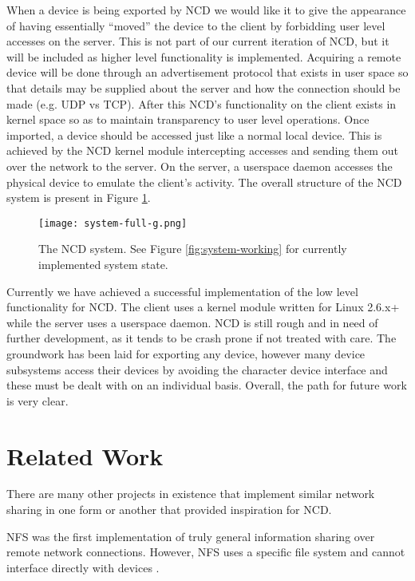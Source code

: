 \documentclass[11pt,twocolumn]{article}
\begin{document}
When a device is being exported by NCD we would like it to give the
appearance of having essentially ``moved'' the device to the client 
by forbidding user level accesses on the server. This is not part 
of our current iteration of NCD, but it will be included as higher
level functionality is implemented. Acquiring a remote device will be
done through an advertisement protocol that exists in user space so
that details may be supplied about the server and how the connection
should be made (e.g. UDP vs TCP).  After this NCD's functionality on
the client exists in kernel space so as to maintain transparency to
user level operations. Once imported, a device should be accessed just
like a normal local device.  This is achieved by the NCD kernel module
intercepting accesses and sending them out over the network to the
server. On the server, a userspace daemon accesses the physical
device to emulate the client's activity. The overall structure of the
NCD system is present in Figure \ref{fig:system-full}.

\begin{figure}[h]
  \centering
  \texttt{[image: system-full-g.png]}
  \caption{The NCD system. See Figure \ref{fig:system-working}
    for currently implemented system state.}
  \label{fig:system-full}
\end{figure}

Currently we have achieved a successful implementation of the low
level functionality for NCD. The client uses a kernel module written
for Linux 2.6.x+ while the server uses a userspace daemon. NCD is
still rough and in need of further development, as it tends to be
crash prone if not treated with care. The groundwork has been laid for
exporting any device, however many device subsystems access their
devices by avoiding the character device interface and these must be
dealt with on an individual basis. Overall, the path for future work
is very clear.

\section{Related Work}
\label{sec:relatedwork}

There are many other projects in existence that implement similar
network sharing in one form or another that provided inspiration for
NCD.

NFS was the first implementation of truly general information sharing
over remote network connections.  However, NFS uses a specific file
system and cannot interface directly with devices \cite{nfs-source}.
\end{document}

